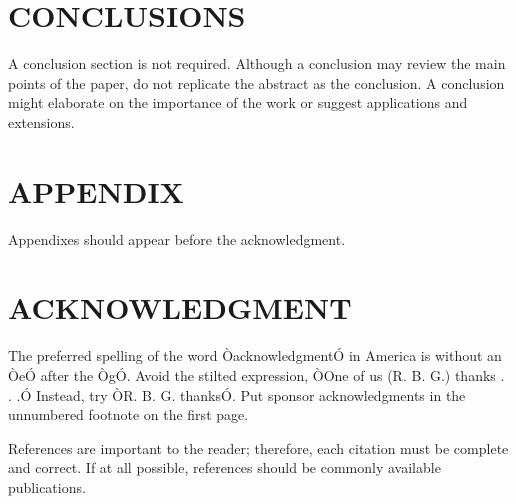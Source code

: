 \documentclass[letterpaper, 10 pt, conference]{ieeeconf}  %
\begin{document}
\clearpage


\section{CONCLUSIONS}

A conclusion section is not required. Although a conclusion may review the main points of the paper, do not replicate the abstract as the conclusion. A conclusion might elaborate on the importance of the work or suggest applications and extensions. 

\addtolength{\textheight}{-12cm}   %







\section*{APPENDIX}

Appendixes should appear before the acknowledgment.

\section*{ACKNOWLEDGMENT}

The preferred spelling of the word ÒacknowledgmentÓ in America is without an ÒeÓ after the ÒgÓ. Avoid the stilted expression, ÒOne of us (R. B. G.) thanks . . .Ó  Instead, try ÒR. B. G. thanksÓ. Put sponsor acknowledgments in the unnumbered footnote on the first page.




References are important to the reader; therefore, each citation must be complete and correct. If at all possible, references should be commonly available publications.





\end{document}
